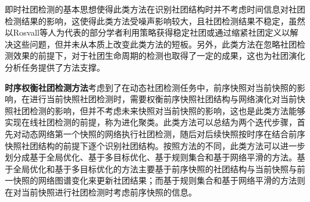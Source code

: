 即时社团检测的基本思想使得此类方法在识别社团结构时并不考虑时间信息对社团检测结果的影响，这使得此类方法受噪声影响较大，且社团检测结果不稳定，虽然以Rosvall等人\cite{rosvall2010mapping}为代表的部分学者利用策略获得稳定社团或通过缩紧社团定义以解决这些问题，但并未从本质上改变此类方法的短板。另外，此类方法在忽略社团检测效果的前提下，对于社团生命周期的检测也取得了一定的成果\cite{chen2010detecting}，这也为社团演化分析任务提供了方法支撑。
 
\textbf{时序权衡社团检测方法}考虑到了在动态社团检测任务中，前序快照对当前快照的影响，在进行当前快照社团检测时，需要权衡前序快照社团结构与网络演化对当前快照社团检测的影响，但并不考虑未来快照对当前快照的影响，这也是此类方法能够实现在线社团检测的前提，称为进化聚类。此类方法可以总结为两个迭代步骤，首先对动态网络第一个快照的网络执行社团检测，随后对后续快照按时序在结合前序快照社团结构的前提下逐个识别社团结构。按照方法的不同，此类方法可以进一步划分成基于全局优化、基于多目标优化、基于规则集合和基于网络平滑的方法。基于全局优化和基于多目标优化的方法主要基于前序快照的社团结构与当前快照与前一快照的网络图谱变化来更新社团结果；而基于规则集合和基于网络平滑的方法则在对当前快照进行社团检测时考虑前序快照的信息。

